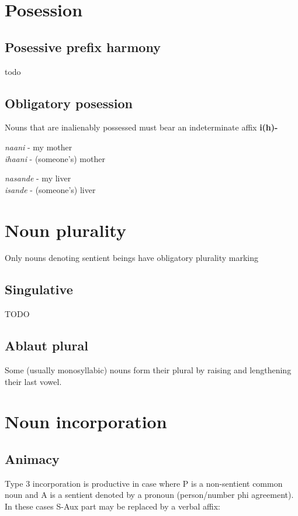 \documentclass[8pt]{book}
\begin{document}
\section{Posession}

\subsection{Posessive prefix harmony}

todo

\subsection{Obligatory posession}

Nouns that are inalienably possessed must bear an indeterminate affix \textbf{i(h)-}

\begin{exe}
\ex \textit{naani} - my mother \\
 \textit{ihaani} - (someone's) mother

\ex \textit{nasande} - my liver \\
 \textit{isande} - (someone's) liver

\end{exe}


\section{Noun plurality}
Only nouns denoting sentient beings have obligatory plurality marking

\subsection{Singulative}
TODO

\subsection{Ablaut plural}
Some (usually monosyllabic) nouns form their plural by raising and lengthening their last vowel.



\section{Noun incorporation}

\subsection{Animacy}
Type 3 incorporation is productive in case where P is a non-sentient common noun and A is a sentient denoted by a pronoun (person/number phi agreement). In these cases S-Aux part may be replaced by a verbal affix:
\end{document}
